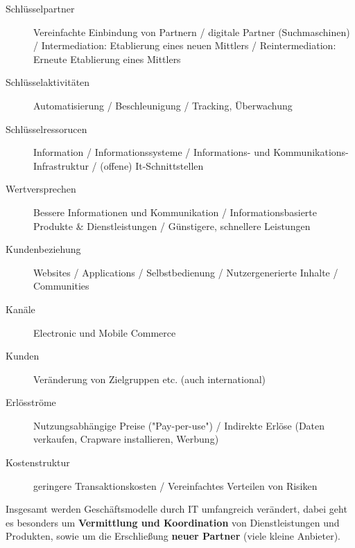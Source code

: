     \begin{description}

        \item[Schlüsselpartner]
            Vereinfachte Einbindung von Partnern / digitale Partner (Suchmaschinen) / Intermediation: Etablierung eines neuen Mittlers
            / Reintermediation: Erneute Etablierung eines Mittlers

        \item[Schlüsselaktivitäten]
            Automatisierung / Beschleunigung / Tracking, Überwachung

        \item[Schlüsselressorucen]
            Information / Informationssysteme / Informations- und Kommunikations-Infrastruktur /
            (offene) It-Schnittstellen

        \item[Wertversprechen]
            Bessere Informationen und Kommunikation / Informationsbasierte Produkte \& Dienstleistungen /
            Günstigere, schnellere Leistungen

        \item[Kundenbeziehung]
            Websites / Applications / Selbstbedienung / Nutzergenerierte Inhalte / Communities

        \item[Kanäle]
            Electronic und Mobile Commerce

        \item[Kunden]
            Veränderung von Zielgruppen etc. (auch international)

        \item[Erlösströme]
            Nutzungsabhängige Preise ("Pay-per-use") /
            Indirekte Erlöse (Daten verkaufen, Crapware installieren, Werbung)

        \item[Kostenstruktur]
            geringere Transaktionskosten / Vereinfachtes Verteilen von Risiken

    \end{description}

    Insgesamt werden Geschäftsmodelle durch IT umfangreich verändert, dabei geht es
    besonders um \textbf{Vermittlung und Koordination} von Dienstleistungen und Produkten,
    sowie um die Erschließung \textbf{neuer Partner} (viele kleine Anbieter).
